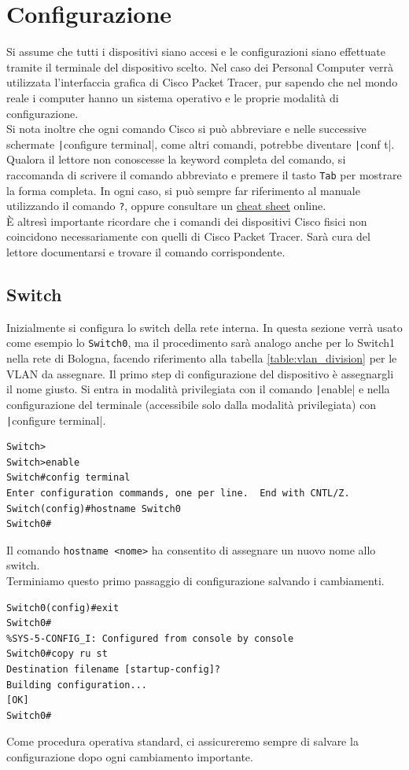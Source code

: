 \documentclass[a4paper,12pt]{report}
\begin{document}
\chapter{Configurazione}
Si assume che tutti i dispositivi siano accesi e le configurazioni siano effettuate tramite il terminale del dispositivo scelto.
%
Nel caso dei Personal Computer verrà utilizzata l'interfaccia grafica di Cisco Packet Tracer, pur sapendo che nel mondo reale i computer hanno un sistema operativo e le proprie modalità di configurazione.
%
\\Si nota inoltre che ogni comando Cisco si può abbreviare e nelle successive schermate \texttt|configure terminal|, come altri comandi, potrebbe diventare \texttt|conf t|.
%
Qualora il lettore non conoscesse la keyword completa del comando, si raccomanda di scrivere il comando abbreviato e premere il tasto \texttt{Tab} per mostrare la forma completa.
%
In ogni caso, si può sempre far riferimento al manuale utilizzando il comando \texttt{?}, oppure consultare un \href{https://www.websentra.com/cisco-commands-cheat-sheet/}{cheat sheet} online.
%
\\È altresì importante ricordare che i comandi dei dispositivi Cisco fisici non coincidono necessariamente con quelli di Cisco Packet Tracer.
%
Sarà cura del lettore documentarsi e trovare il comando corrispondente.
\section{Switch}
Inizialmente si configura lo switch della rete interna.
%
In questa sezione verrà usato come esempio lo \texttt{Switch0}, ma il procedimento sarà analogo anche per lo Switch1 nella rete di Bologna, facendo riferimento alla tabella \ref{table:vlan_division} per le VLAN da assegnare.
Il primo step di configurazione del dispositivo è assegnargli il nome giusto.
%
Si entra in modalità privilegiata con il comando \texttt|enable| e nella configurazione del terminale (accessibile solo dalla modalità privilegiata) con \texttt|configure terminal|.
\begin{verbatim}
Switch>
Switch>enable
Switch#config terminal
Enter configuration commands, one per line.  End with CNTL/Z.
Switch(config)#hostname Switch0
Switch0#
\end{verbatim}
Il comando \texttt{hostname <nome>} ha consentito di assegnare un nuovo nome allo switch.
\\Terminiamo questo primo passaggio di configurazione salvando i cambiamenti.
\begin{verbatim}
Switch0(config)#exit
Switch0#
%SYS-5-CONFIG_I: Configured from console by console
Switch0#copy ru st
Destination filename [startup-config]? 
Building configuration...
[OK]
Switch0#
\end{verbatim}
Come procedura operativa standard, ci assicureremo sempre di salvare la configurazione dopo ogni cambiamento importante. 
\end{document}
